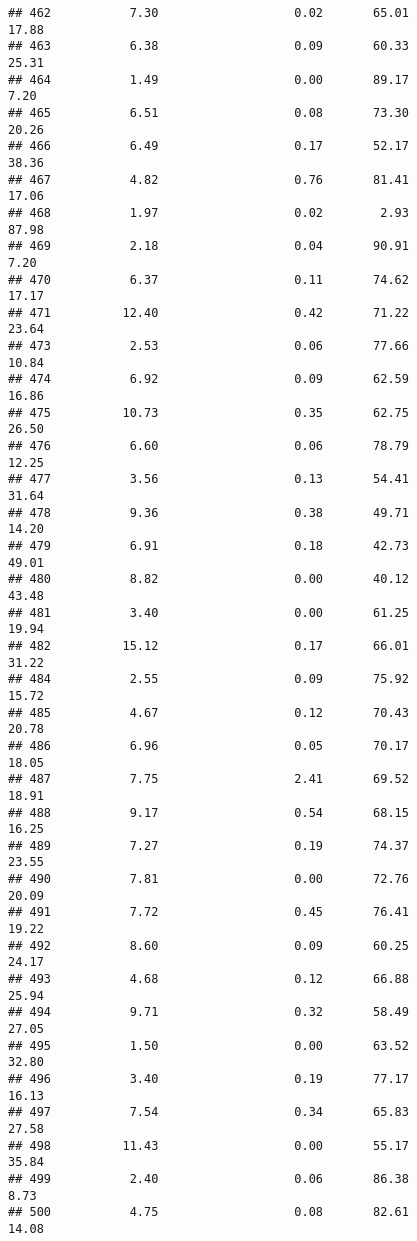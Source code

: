 \documentclass[
]{article}
\begin{document}
\begin{verbatim}
## 462           7.30                   0.02       65.01          17.88
## 463           6.38                   0.09       60.33          25.31
## 464           1.49                   0.00       89.17           7.20
## 465           6.51                   0.08       73.30          20.26
## 466           6.49                   0.17       52.17          38.36
## 467           4.82                   0.76       81.41          17.06
## 468           1.97                   0.02        2.93          87.98
## 469           2.18                   0.04       90.91           7.20
## 470           6.37                   0.11       74.62          17.17
## 471          12.40                   0.42       71.22          23.64
## 473           2.53                   0.06       77.66          10.84
## 474           6.92                   0.09       62.59          16.86
## 475          10.73                   0.35       62.75          26.50
## 476           6.60                   0.06       78.79          12.25
## 477           3.56                   0.13       54.41          31.64
## 478           9.36                   0.38       49.71          14.20
## 479           6.91                   0.18       42.73          49.01
## 480           8.82                   0.00       40.12          43.48
## 481           3.40                   0.00       61.25          19.94
## 482          15.12                   0.17       66.01          31.22
## 484           2.55                   0.09       75.92          15.72
## 485           4.67                   0.12       70.43          20.78
## 486           6.96                   0.05       70.17          18.05
## 487           7.75                   2.41       69.52          18.91
## 488           9.17                   0.54       68.15          16.25
## 489           7.27                   0.19       74.37          23.55
## 490           7.81                   0.00       72.76          20.09
## 491           7.72                   0.45       76.41          19.22
## 492           8.60                   0.09       60.25          24.17
## 493           4.68                   0.12       66.88          25.94
## 494           9.71                   0.32       58.49          27.05
## 495           1.50                   0.00       63.52          32.80
## 496           3.40                   0.19       77.17          16.13
## 497           7.54                   0.34       65.83          27.58
## 498          11.43                   0.00       55.17          35.84
## 499           2.40                   0.06       86.38           8.73
## 500           4.75                   0.08       82.61          14.08

\end{verbatim}
\end{document}
